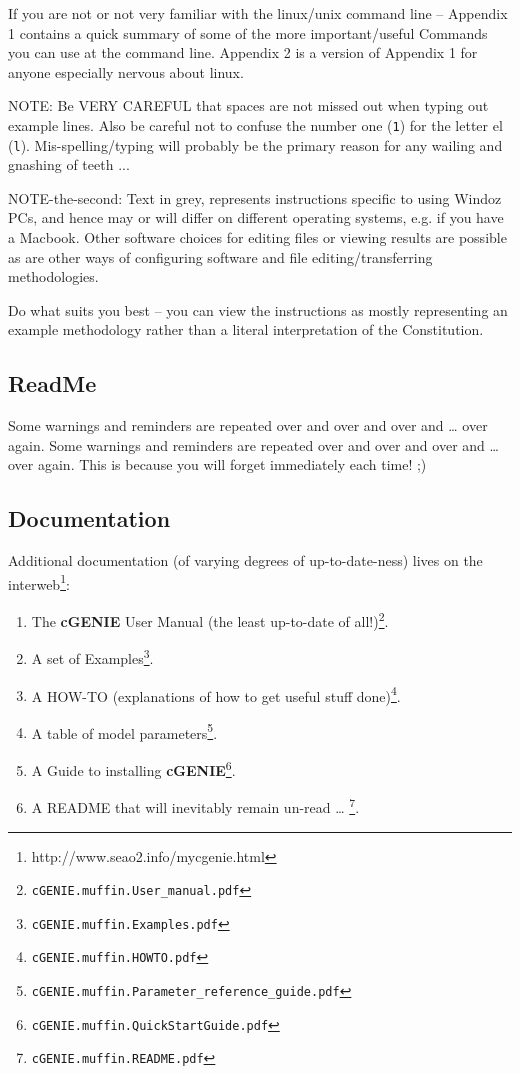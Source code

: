 \documentclass[11pt,fleqn]{book} %
\begin{document}
If you are not or not very familiar with the linux/unix command line – Appendix 1 contains a quick summary of some of the more important/useful Commands you can use at the command line. Appendix 2 is a version of Appendix 1 for anyone especially nervous about linux.

NOTE: Be VERY CAREFUL that spaces are not missed out when typing out example lines. Also be careful not to confuse the number one (\texttt{1}) for the letter el (\texttt{l}). Mis-spelling/typing will probably be the primary reason for any wailing and gnashing of teeth ...

NOTE-the-second: Text  in grey, represents instructions specific to using Windoz PCs, and hence may or will differ on different operating systems, e.g. if you have a Macbook. Other software choices for editing files or viewing results are possible as are other ways of configuring software and file editing/transferring methodologies.

Do what suits you best – you can view the instructions as mostly representing an example methodology rather than a literal interpretation of the Constitution.


\subsection{ReadMe}

Some warnings and reminders are repeated over and over and over and … over again.
Some warnings and reminders are repeated over and over and over and … over again.  
This is because you will forget immediately each time! ;)


\subsection{Documentation}

Additional documentation (of varying degrees of up-to-date-ness) lives on the interweb\footnote{http://www.seao2.info/mycgenie.html}:

\begin{enumerate}[noitemsep]
\setlength{\itemindent}{.2in}
\item The \textbf{cGENIE} User Manual (the least up-to-date of all!)\footnote{\texttt{cGENIE.muffin.User\_manual.pdf}}.
\item A set of Examples\footnote{\texttt{cGENIE.muffin.Examples.pdf}}.
\item A HOW-TO (explanations of how to get useful stuff done)\footnote{\texttt{cGENIE.muffin.HOWTO.pdf}}.
\item A table of model parameters\footnote{\texttt{cGENIE.muffin.Parameter\_reference\_guide.pdf}}.
\item A Guide to installing \textbf{cGENIE}\footnote{\texttt{cGENIE.muffin.QuickStartGuide.pdf}}.
\item A README that will inevitably remain un-read … \footnote{\texttt{cGENIE.muffin.README.pdf}}.
\end{enumerate}
\end{document}
